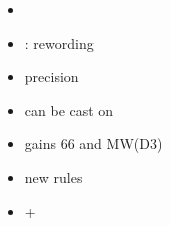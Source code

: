 
\largefontsize{}

\subtitle{2023 \betaname{} 2}
\begin{itemize}
	\item \UDambush
	\item \crownofthepharaohs{}: \commandingpresence{} rewording
	\item \deathisonlythebeginning{} precision
	\item \bookofthedead{} can be cast on \ensouledstatue{}
	\item \charnelcatapult{} gains 6\timess{}6 and MW(D3)
	\item \petrifyinggaze{} new rules
	\item \sandstalkers{} + \autonomous{}

\end{itemize}

